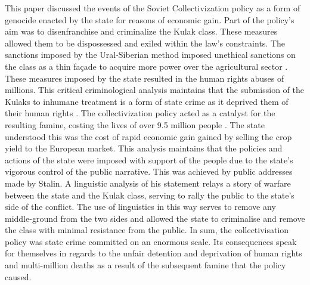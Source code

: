 \documentclass[12pt, a4paper,]{scrartcl}
\begin{document}
This paper discussed the events of the Soviet Collectivization policy as a form of genocide enacted by the state for reasons of economic gain. Part of the policy's aim was to disenfranchise and criminalize the Kulak class. These measures allowed them to be dispossessed and exiled within the law's constraints. The sanctions imposed by the Ural-Siberian method imposed unethical sanctions on the class as a thin façade to acquire more power over the agricultural sector \cite{Marker1998}. These measures imposed by the state resulted in the human rights abuses of millions. This critical criminological analysis maintains that the submission of the Kulaks to inhumane treatment is a form of state crime as it deprived them of their human rights \cite{Khlevniuk2004,Green2000}. The collectivization policy acted as a catalyst for the resulting famine, costing the lives of over 9.5 million people \cite{Livi-Bacci1993OnUnion}. The state understood this was the cost of rapid economic gain gained by selling the crop yield to the European market. This analysis maintains that the policies and actions of the state were imposed with support of the people due to the state's vigorous control of the public narrative. This was achieved by public addresses made by Stalin. A linguistic analysis of his statement relays a story of warfare between the state and the Kulak class, serving to rally the public to the state's side of the conflict. The use of linguistics in this way serves to remove any middle-ground from the two sides and allowed the state to criminalise and remove the class with minimal resistance from the public. In sum, the collectivisation policy was state crime committed on an enormous scale. Its consequences speak for themselves in regards to the unfair detention and deprivation of human rights and multi-million deaths as a result of the subsequent famine that the policy caused.


\newpage



%


\end{document}
